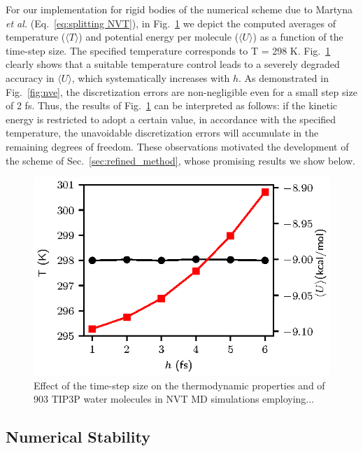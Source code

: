 \documentclass[
journal=jctcce,
layout=twocolumn
]{achemso}
\newcommand{\timestep}{h}
\begin{document}
For our implementation for rigid bodies of the numerical scheme due to Martyna \textit{et al.} \cite{Martyna_1996} (Eq.~\ref{eq:splitting NVT}), in Fig.~\ref{fig:props_k_m} we depict the computed averages of temperature ($\langle T \rangle$) and potential energy per molecule ($\langle U \rangle$) as a function of the time-step size. 
The specified temperature corresponds to T = 298 K.
Fig.~\ref{fig:props_k_m} clearly shows that a suitable temperature control leads to a severely degraded accuracy in $\langle U \rangle$, which systematically increases with $\timestep$.
As demonstrated in Fig.~\ref{fig:nve}, the discretization errors are non-negligible even for a small step size of 2 fs.
Thus, the results of Fig.~\ref{fig:props_k_m} can be interpreted as follows: if the kinetic energy is restricted to adopt a certain value, in accordance with the specified temperature, the unavoidable discretization errors will accumulate in the remaining degrees of freedom.
These observations motivated the development of the scheme of Sec.~\ref{sec:refined_method}, whose promising results we show below.

\begin{figure}
	\includegraphics{Figures/thermodynamic_properties_intro.eps}
    \caption{Effect of the time-step size on the thermodynamic properties and of 903 TIP3P\cite{Jorgensen_1983} water molecules in NVT MD simulations employing...}
	\label{fig:props_k_m}
\end{figure}

\subsection*{Numerical Stability}
\end{document}
